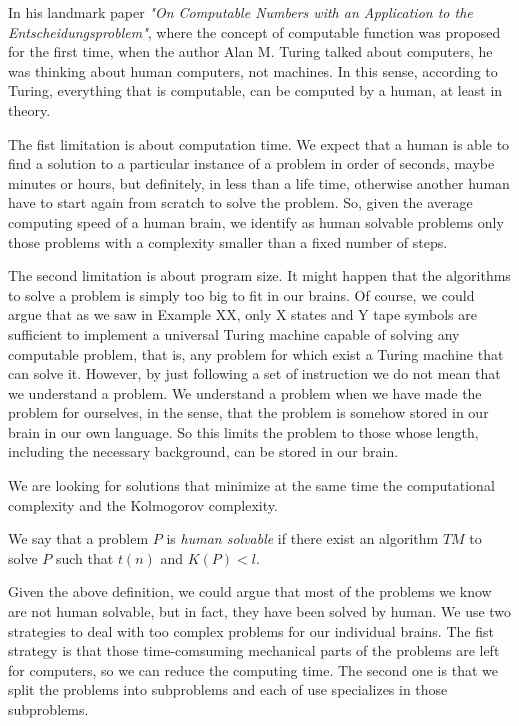 In his landmark paper \emph{"On Computable Numbers with an Application to the Entscheidungsproblem"}, where the concept of computable function was proposed for the first time, when the author Alan M. Turing talked about computers, he was thinking about human computers, not machines. In this sense, according to Turing, everything that is computable, can be computed by a human, at least in theory.

The fist limitation is about computation time. We expect that a human is able to find a solution to a particular instance of a problem in order of seconds, maybe minutes or hours, but definitely, in less than a life time, otherwise another human have to start again from scratch to solve the problem. So, given the average computing speed of a human brain, we identify as human solvable problems only those problems with a complexity smaller than a fixed number of steps.

The second limitation is about program size. It might happen that the algorithms to solve a problem is simply too big to fit in our brains. Of course, we could argue that {\color{red} as we saw in Example XX, only X states and Y tape symbols} are sufficient to implement a universal Turing machine capable of solving any computable problem, that is, any problem for which exist a Turing machine that can solve it. However, by just following a set of instruction we do not mean that we understand a problem. We understand a problem when we have made the problem for ourselves, in the sense, that the problem is somehow stored in our brain in our own language. So this limits the problem to those whose length, including the necessary background, can be stored in our brain.

We are looking for solutions that minimize at the same time the computational complexity and the Kolmogorov complexity.

\begin{definition}
We say that a problem $P$ is \emph{human solvable} if there exist an algorithm $TM$ to solve $P$ such that $t(n)$ and $K(P) < l$.
\end{definition}

Given the above definition, we could argue that most of the problems we know are not human solvable, but in fact, they have been solved by human. We use two strategies to deal with too complex problems for our individual brains. The fist strategy is that those time-comsuming mechanical parts of the problems are left for computers, so we can reduce the computing time. The second one is that we split the problems into subproblems and each of use specializes in those subproblems.

